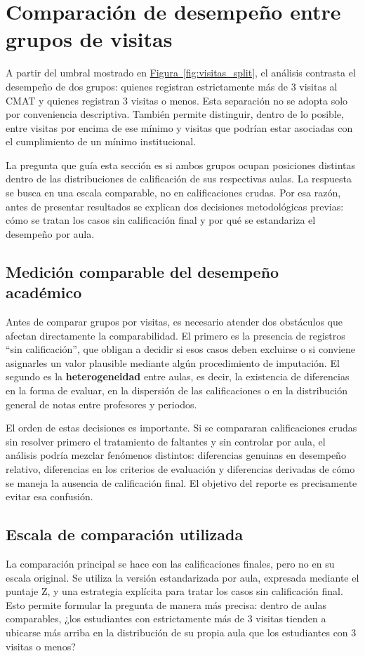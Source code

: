 \documentclass[10pt,letterpaper]{article} %
\numberwithin{figure}{subsection}
\let\oldsection\section
\renewcommand{\section}{\clearpage\oldsection}
\begin{document}
\FloatBarrier
\section{Comparación de desempeño entre grupos de visitas}
A partir del umbral mostrado en \hyperref[fig:visitas_split]{Figura~\ref{fig:visitas_split}}, el análisis contrasta el desempeño de dos grupos: quienes registran estrictamente más de 3 visitas al CMAT y quienes registran 3 visitas o menos. Esta separación no se adopta solo por conveniencia descriptiva. También permite distinguir, dentro de lo posible, entre visitas por encima de ese mínimo y visitas que podrían estar asociadas con el cumplimiento de un mínimo institucional.

La pregunta que guía esta sección es si ambos grupos ocupan posiciones distintas dentro de las distribuciones de calificación de sus respectivas aulas. La respuesta se busca en una escala comparable, no en calificaciones crudas. Por esa razón, antes de presentar resultados se explican dos decisiones metodológicas previas: cómo se tratan los casos sin calificación final y por qué se estandariza el desempeño por aula.

\subsection{Medición comparable del desempeño académico}
Antes de comparar grupos por visitas, es necesario atender dos obstáculos que afectan directamente la comparabilidad. El primero es la presencia de registros ``sin calificación'', que obligan a decidir si esos casos deben excluirse o si conviene asignarles un valor plausible mediante algún procedimiento de imputación. El segundo es la \textbf{heterogeneidad} entre aulas, es decir, la existencia de diferencias en la forma de evaluar, en la dispersión de las calificaciones o en la distribución general de notas entre profesores y periodos.

El orden de estas decisiones es importante. Si se compararan calificaciones crudas sin resolver primero el tratamiento de faltantes y sin controlar por aula, el análisis podría mezclar fenómenos distintos: diferencias genuinas en desempeño relativo, diferencias en los criterios de evaluación y diferencias derivadas de cómo se maneja la ausencia de calificación final. El objetivo del reporte es precisamente evitar esa confusión.

\subsection{Escala de comparación utilizada}
La comparación principal se hace con las calificaciones finales, pero no en su escala original. Se utiliza la versión estandarizada por aula, expresada mediante el puntaje Z, y una estrategia explícita para tratar los casos sin calificación final. Esto permite formular la pregunta de manera más precisa: dentro de aulas comparables, ¿los estudiantes con estrictamente más de 3 visitas tienden a ubicarse más arriba en la distribución de su propia aula que los estudiantes con 3 visitas o menos?
\end{document}
